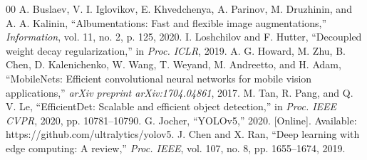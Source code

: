 \documentclass[conference]{IEEEtran}
\begin{document}
\begin{thebibliography}{00}
 A. Buslaev, V. I. Iglovikov, E. Khvedchenya, A. Parinov, M. Druzhinin, and A. A. Kalinin, ``Albumentations: Fast and flexible image augmentations,'' \textit{Information}, vol. 11, no. 2, p. 125, 2020.
 I. Loshchilov and F. Hutter, ``Decoupled weight decay regularization,'' in \textit{Proc. ICLR}, 2019.
 A. G. Howard, M. Zhu, B. Chen, D. Kalenichenko, W. Wang, T. Weyand, M. Andreetto, and H. Adam, ``MobileNets: Efficient convolutional neural networks for mobile vision applications,'' \textit{arXiv preprint arXiv:1704.04861}, 2017.
 M. Tan, R. Pang, and Q. V. Le, ``EfficientDet: Scalable and efficient object detection,'' in \textit{Proc. IEEE CVPR}, 2020, pp. 10781--10790.
 G. Jocher, ``YOLOv5,'' 2020. [Online]. Available: https://github.com/ultralytics/yolov5.
 J. Chen and X. Ran, ``Deep learning with edge computing: A review,'' \textit{Proc. IEEE}, vol. 107, no. 8, pp. 1655--1674, 2019.

\end{thebibliography}
\end{document}
